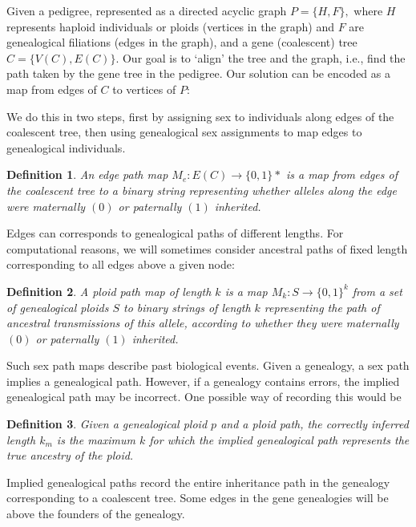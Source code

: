 \documentclass[14pt]{extarticle}
\newtheorem{definition}{Definition}
\begin{document}
Given a pedigree, represented as a directed acyclic graph $P = \{H, F\},$ where $H$ represents haploid individuals or ploids (vertices in the graph) and $F$ are genealogical filiations (edges in the graph), and a gene (coalescent) tree $C = \{V(C), E(C)\}.$ Our goal is to `align' the tree and the graph, i.e., find the path taken by the gene tree in the pedigree. Our solution can be encoded as a map from edges of $C$ to vertices of $P$:

We do this in two steps, first by assigning sex to individuals along edges of the coalescent tree, then using genealogical sex assignments to map edges to genealogical individuals.  

\begin{definition}
An edge path map $M_e:E(C) \rightarrow \{0,1\}*$ is a map from edges of the coalescent tree to a binary string representing whether alleles along the edge were maternally $(0)$ or paternally $(1)$ inherited.     
\end{definition}

Edges can corresponds to genealogical paths of different lengths. For computational reasons, we will sometimes consider ancestral paths of fixed length corresponding to all edges above a given node:

\begin{definition}
A ploid path map of length $k$ is a map $M_k:S \rightarrow \{0,1\}^k$ from a set of genealogical ploids $S$ to binary strings of length $k$ representing the path of ancestral transmissions of this allele, according to whether they were maternally $(0)$ or paternally $(1)$ inherited.      
\end{definition}

Such sex path maps describe past biological events. Given a genealogy, a sex path implies a genealogical path. However, if a genealogy contains errors, the implied genealogical path may be incorrect. One possible way of recording this would be

\begin{definition}
Given a genealogical ploid $p$ and a ploid path, the correctly inferred length $k_m$ is the maximum $k$ for which the implied genealogical path represents the true ancestry of the ploid.        
\end{definition}

Implied genealogical paths record the entire inheritance path in the genealogy corresponding to a coalescent tree. Some edges in the gene genealogies will be above the founders of the genealogy. 
\end{document}
